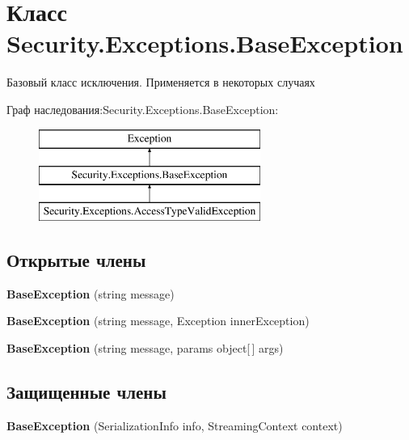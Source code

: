 \hypertarget{class_security_1_1_exceptions_1_1_base_exception}{}\section{Класс Security.\+Exceptions.\+Base\+Exception}
\label{class_security_1_1_exceptions_1_1_base_exception}


Базовый класс исключения. Применяется в некоторых случаях  


Граф наследования\+:Security.\+Exceptions.\+Base\+Exception\+:\begin{figure}[H]
\begin{center}
\leavevmode
\includegraphics[height=3.000000cm]{d5/d1f/class_security_1_1_exceptions_1_1_base_exception}
\end{center}
\end{figure}
\subsection*{Открытые члены}
\begin{DoxyCompactItemize}
\item 
\mbox{\label{class_security_1_1_exceptions_1_1_base_exception_af6b9cf30e6bafc5c566478ce27430315}} 
{\bfseries Base\+Exception} (string message)
\item 
\mbox{\label{class_security_1_1_exceptions_1_1_base_exception_a6cb3a6a7e73208baa4a6ac06b1f25277}} 
{\bfseries Base\+Exception} (string message, Exception inner\+Exception)
\item 
\mbox{\label{class_security_1_1_exceptions_1_1_base_exception_a2bf2a624ee913419a2823d05b8ff6aa6}} 
{\bfseries Base\+Exception} (string message, params object\mbox{[}$\,$\mbox{]} args)
\end{DoxyCompactItemize}
\subsection*{Защищенные члены}
\begin{DoxyCompactItemize}
\item 
\mbox{\label{class_security_1_1_exceptions_1_1_base_exception_a34a0ca7e9f02d6ee37c060387a689075}} 
{\bfseries Base\+Exception} (Serialization\+Info info, Streaming\+Context context)
\end{DoxyCompactItemize}



